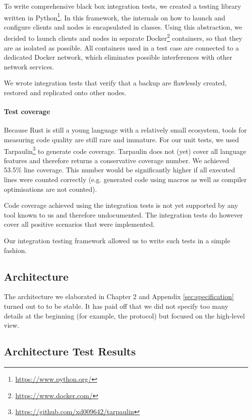 To write comprehensive black box integration tests, we created a testing library written in Python\footnote{\url{https://www.python.org/}}. In this framework, the internals on how to launch and configure \glspl{client} and \glspl{node} is encapsulated in classes. Using this abstraction, we decided to launch \glspl{client} and \glspl{node} in separate Docker\footnote{\url{https://www.docker.com/}} containers, so that they are as isolated as possible. All containers used in a test case are connected to a dedicated Docker network, which eliminates possible interferences with other network services.

We wrote integration tests that verify that a backup are flawlessly created, restored and replicated onto other \glspl{node}.

\paragraph{Test coverage}

Because Rust is still a young language with a relatively small ecosystem, tools for measuring code quality are still rare and immature. For our unit tests, we used Tarpaulin\footnote{\url{https://github.com/xd009642/tarpaulin}} to generate code coverage. Tarpaulin does not (yet) cover all language features and therefore returns a conservative coverage number. We achieved 53.5\% line coverage. This number would be significantly higher if all executed lines were counted correctly  (e.g. generated code using macros as well as compiler optimisations are not counted).

Code coverage achieved using the integration tests is not yet supported by any tool known to us and therefore undocumented. The integration tests do however cover all positive scenarios that were implemented.

Our integration testing framework allowed us to write such tests in a simple fashion.

\subsection{Architecture}

The architecture we elaborated in Chapter 2 and Appendix \ref{sec:specification} turned out to to be stable. It has paid off that we did not specify too many details at the beginning (for example, the protocol) but focused on the high-level view.

\subsection{Architecture Test Results}

